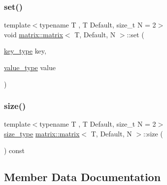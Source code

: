 \mbox{\label{structmatrix_1_1matrix_aec0384fc656feed77a2c71c2ed0065d8}} 
\subsubsection{\texorpdfstring{set()}{set()}}
{\footnotesize\ttfamily template$<$typename T , T Default, size\+\_\+t N = 2$>$ \\
void \hyperlink{structmatrix_1_1matrix}{matrix\+::matrix}$<$ T, Default, N $>$\+::set (\begin{DoxyParamCaption}\item[{\hyperlink{structmatrix_1_1matrix_af7b5498ac1b615cb9ef51bd185a2557e}{key\+\_\+type}}]{key,  }\item[{\hyperlink{structmatrix_1_1matrix_ab940e7a84942339cdee7c0f0d3bd8ef9}{value\+\_\+type}}]{value }\end{DoxyParamCaption})\hspace{0.3cm}{\ttfamily [inline]}}

\mbox{\label{structmatrix_1_1matrix_a56f1554d0f871ac5e2b3dac89d26113e}} 
\subsubsection{\texorpdfstring{size()}{size()}}
{\footnotesize\ttfamily template$<$typename T , T Default, size\+\_\+t N = 2$>$ \\
\hyperlink{structmatrix_1_1matrix_aebc6efd587a1c3f0a951631d6ee6837f}{size\+\_\+type} \hyperlink{structmatrix_1_1matrix}{matrix\+::matrix}$<$ T, Default, N $>$\+::size (\begin{DoxyParamCaption}{ }\end{DoxyParamCaption}) const\hspace{0.3cm}{\ttfamily [inline]}}



\subsection{Member Data Documentation}
\mbox{\label{structmatrix_1_1matrix_a4c0193b1fdd949b71f717232cd2c7ce1}} 
